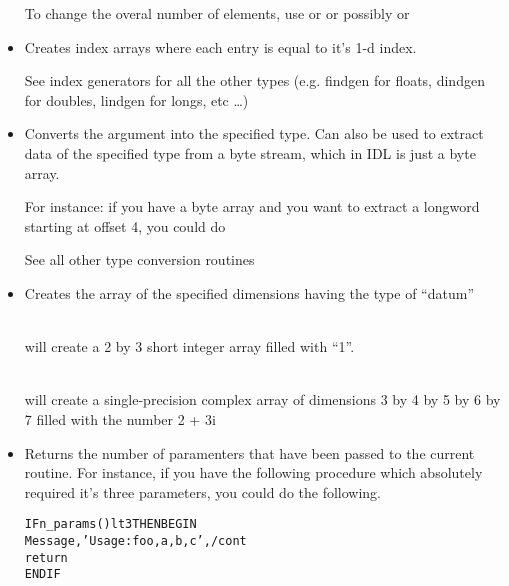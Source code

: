 \begin{itemize}
   To change the overal number of elements, use  or
    or possibly  or 


    \item {}

       Creates index arrays where each entry is equal to it's 1-d
      index.

       See index generators for all the other types (e.g. findgen for
       floats, dindgen for doubles, lindgen for longs, etc \ldots)

    \item {}

        Converts the argument into the specified type. Can also be
    used to extract data of the specified type from a byte stream,
    which in IDL is just a byte array. 

    For instance: if you have a byte array  and you
    want to extract a longword starting at offset 4, you could do 


        See all other type conversion routines

    \item {}

        Creates the array of the specified dimensions having the type
    of ``datum''

    \\
     will create a 2 by 3 short integer array filled with ``1''.

    \\
     will create a single-precision complex array of dimensions 3 by 4
    by 5 by 6 by 7 filled with the number 2 + 3i


    \item {}

      Returns the number of paramenters that have been passed to the
    current routine. For instance, if you have the following procedure
    which absolutely required it's three parameters, you could do the
    following.

\begin{alltt}
  IF n_params() lt 3 THEN BEGIN
    Message,'Usage:  foo, a,b,c',/cont
    return
  ENDIF 
\end{alltt}


\end{itemize}
